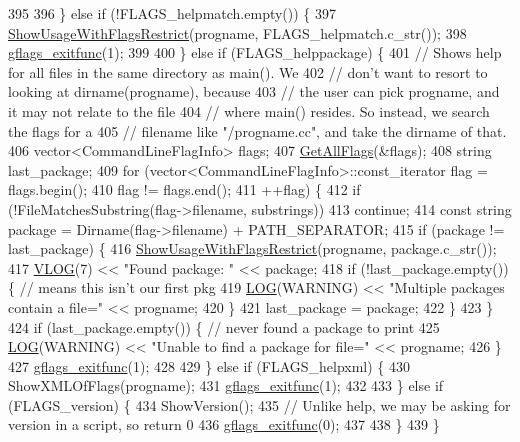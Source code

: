 \begin{DoxyCode}
395 
396   \} \textcolor{keywordflow}{else} \textcolor{keywordflow}{if} (!FLAGS\_helpmatch.empty()) \{
397     \hyperlink{namespaceGFLAGS__NAMESPACE_aad17234ebace18731c53ea6cf8100148}{ShowUsageWithFlagsRestrict}(progname, FLAGS\_helpmatch.c\_str());
398     \hyperlink{namespaceGFLAGS__NAMESPACE_a92540f20c8cabd198b987ac84a539078}{gflags\_exitfunc}(1);
399 
400   \} \textcolor{keywordflow}{else} \textcolor{keywordflow}{if} (FLAGS\_helppackage) \{
401     \textcolor{comment}{// Shows help for all files in the same directory as main().  We}
402     \textcolor{comment}{// don't want to resort to looking at dirname(progname), because}
403     \textcolor{comment}{// the user can pick progname, and it may not relate to the file}
404     \textcolor{comment}{// where main() resides.  So instead, we search the flags for a}
405     \textcolor{comment}{// filename like "/progname.cc", and take the dirname of that.}
406     vector<CommandLineFlagInfo> flags;
407     \hyperlink{namespaceGFLAGS__NAMESPACE_ae1f8d83ef21f4b5f7e2af46b1c9bcbd5}{GetAllFlags}(&flags);
408     \textcolor{keywordtype}{string} last\_package;
409     \textcolor{keywordflow}{for} (vector<CommandLineFlagInfo>::const\_iterator flag = flags.begin();
410          flag != flags.end();
411          ++flag) \{
412       \textcolor{keywordflow}{if} (!FileMatchesSubstring(flag->filename, substrings))
413         \textcolor{keywordflow}{continue};
414       \textcolor{keyword}{const} \textcolor{keywordtype}{string} \textcolor{keyword}{package }= Dirname(flag->filename) + PATH\_SEPARATOR;
415       \textcolor{keywordflow}{if} (package != last\_package) \{
416         \hyperlink{namespaceGFLAGS__NAMESPACE_aad17234ebace18731c53ea6cf8100148}{ShowUsageWithFlagsRestrict}(progname, package.c\_str());
417         \hyperlink{util_8h_afc28ec91d066c96a3a139441e029f326}{VLOG}(7) << \textcolor{stringliteral}{"Found package: "} << package;
418         \textcolor{keywordflow}{if} (!last\_package.empty()) \{      \textcolor{comment}{// means this isn't our first pkg}
419           \hyperlink{util_8h_aba7b09d6e8fbe414c23705ad24dde6ff}{LOG}(WARNING) << \textcolor{stringliteral}{"Multiple packages contain a file="} << progname;
420         \}
421         last\_package = package;
422       \}
423     \}
424     \textcolor{keywordflow}{if} (last\_package.empty()) \{   \textcolor{comment}{// never found a package to print}
425       \hyperlink{util_8h_aba7b09d6e8fbe414c23705ad24dde6ff}{LOG}(WARNING) << \textcolor{stringliteral}{"Unable to find a package for file="} << progname;
426     \}
427     \hyperlink{namespaceGFLAGS__NAMESPACE_a92540f20c8cabd198b987ac84a539078}{gflags\_exitfunc}(1);
428 
429   \} \textcolor{keywordflow}{else} \textcolor{keywordflow}{if} (FLAGS\_helpxml) \{
430     ShowXMLOfFlags(progname);
431     \hyperlink{namespaceGFLAGS__NAMESPACE_a92540f20c8cabd198b987ac84a539078}{gflags\_exitfunc}(1);
432 
433   \} \textcolor{keywordflow}{else} \textcolor{keywordflow}{if} (FLAGS\_version) \{
434     ShowVersion();
435     \textcolor{comment}{// Unlike help, we may be asking for version in a script, so return 0}
436     \hyperlink{namespaceGFLAGS__NAMESPACE_a92540f20c8cabd198b987ac84a539078}{gflags\_exitfunc}(0);
437 
438   \}
439 \}
\end{DoxyCode}
